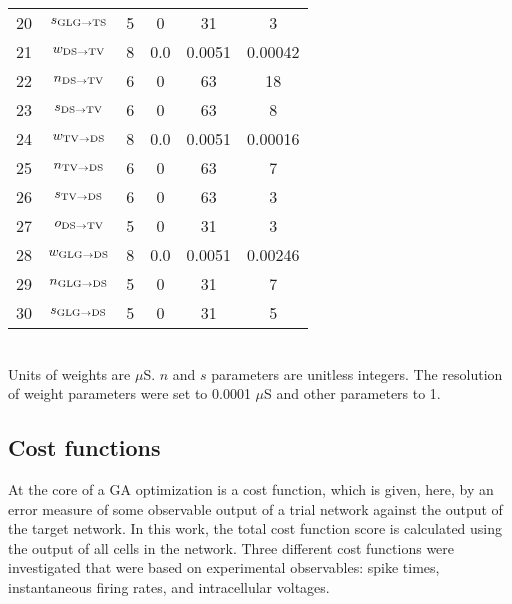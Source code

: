 \begin{table}[tp]
\begin{tabularx}{0.7\textwidth}{lccccc}
20 & $s_{{\rm GLG}\to {\rm TS}} $  &  5  &  0  &    31     & 3 \\   %
21 &  $w_{{\rm DS}\to {\rm TV}} $  &  8  & 0.0 &  0.0051   & 0.00042 \\ %
22 &  $n_{{\rm DS}\to {\rm TV}} $  &  6  &  0  &    63     & 18 \\ %
23 &  $s_{{\rm DS}\to {\rm TV}} $  &  6  &  0  &    63     & 8 \\   %
24 &  $w_{{\rm TV}\to {\rm DS}} $  &  8  & 0.0 &  0.0051   & 0.00016 \\ %
25 &  $n_{{\rm TV}\to {\rm DS}} $  &  6  &  0  &    63     & 7   \\ %
26 &  $s_{{\rm TV}\to {\rm DS}} $  &  6  &  0  &    63     & 3 \\   %
27 &  $o_{{\rm DS}\to {\rm TV}} $  &  5  &  0  &    31     & 3 \\ %
28 & $w_{{\rm GLG}\to {\rm DS}} $  &  8  & 0.0 &  0.0051   & 0.00246 \\   %
29 & $n_{{\rm GLG}\to {\rm DS}} $  &  5  &  0  &    31     & 7 \\ %
30 & $s_{{\rm GLG}\to {\rm DS}} $ &  5  &  0  &    31     & 5 \\[0.5ex] \bottomrule
\end{tabularx}\\
\vspace{0.5ex} 
\footnotesize{Units of weights are $\mu$S. $n$ and $s$
  parameters are unitless integers. The resolution of weight
  parameters were set to 0.0001 $\mu$S and other parameters to 1.}
\end{table}




\subsection{Cost functions}\label{sec:GA:cost-functions}

At the core of a GA optimization is a cost function, which is given,
here, by an error measure of some observable output of a trial network
against the output of the target network. In this work, the total cost
function score is calculated using the output of all cells in the
network.  Three different cost functions were investigated that were
based on experimental observables: spike times, instantaneous firing
rates, and intracellular voltages.


